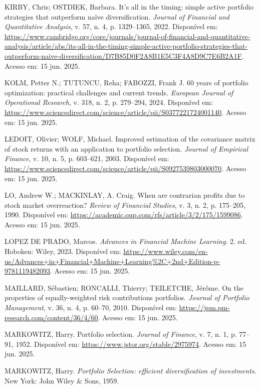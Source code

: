 \noindent
KIRBY, Chris; OSTDIEK, Barbara. It's all in the timing: simple active portfolio strategies that outperform naïve diversification. \textit{Journal of Financial and Quantitative Analysis}, v. 57, n. 4, p. 1329--1365, 2022. Disponível em: \url{https://www.cambridge.org/core/journals/journal-of-financial-and-quantitative-analysis/article/abs/its-all-in-the-timing-simple-active-portfolio-strategies-that-outperform-naive-diversification/D7B85D0F2A8B1E5C3F4A8D9C7E6B2A1F}. Acesso em: 15 jun. 2025.

\noindent
KOLM, Petter N.; TUTUNCU, Reha; FABOZZI, Frank J. 60 years of portfolio optimization: practical challenges and current trends. \textit{European Journal of Operational Research}, v. 318, n. 2, p. 279--294, 2024. Disponível em: \url{https://www.sciencedirect.com/science/article/pii/S0377221724001140}. Acesso em: 15 jun. 2025.

\noindent
LEDOIT, Olivier; WOLF, Michael. Improved estimation of the covariance matrix of stock returns with an application to portfolio selection. \textit{Journal of Empirical Finance}, v. 10, n. 5, p. 603--621, 2003. Disponível em: \url{https://www.sciencedirect.com/science/article/pii/S0927539803000070}. Acesso em: 15 jun. 2025.

\noindent
LO, Andrew W.; MACKINLAY, A. Craig. When are contrarian profits due to stock market overreaction? \textit{Review of Financial Studies}, v. 3, n. 2, p. 175--205, 1990. Disponível em: \url{https://academic.oup.com/rfs/article/3/2/175/1599086}. Acesso em: 15 jun. 2025.

\noindent
LOPEZ DE PRADO, Marcos. \textit{Advances in Financial Machine Learning}. 2. ed. Hoboken: Wiley, 2023. Disponível em: \url{https://www.wiley.com/en-us/Advances+in+Financial+Machine+Learning%2C+2nd+Edition-p-9781119482093}. Acesso em: 15 jun. 2025.

\noindent
MAILLARD, Sébastien; RONCALLI, Thierry; TEILETCHE, Jérôme. On the properties of equally-weighted risk contributions portfolios. \textit{Journal of Portfolio Management}, v. 36, n. 4, p. 60--70, 2010. Disponível em: \url{https://jpm.pm-research.com/content/36/4/60}. Acesso em: 15 jun. 2025.

\noindent
MARKOWITZ, Harry. Portfolio selection. \textit{Journal of Finance}, v. 7, n. 1, p. 77--91, 1952. Disponível em: \url{https://www.jstor.org/stable/2975974}. Acesso em: 15 jun. 2025.

\noindent
MARKOWITZ, Harry. \textit{Portfolio Selection: efficient diversification of investments}. New York: John Wiley \& Sons, 1959.

